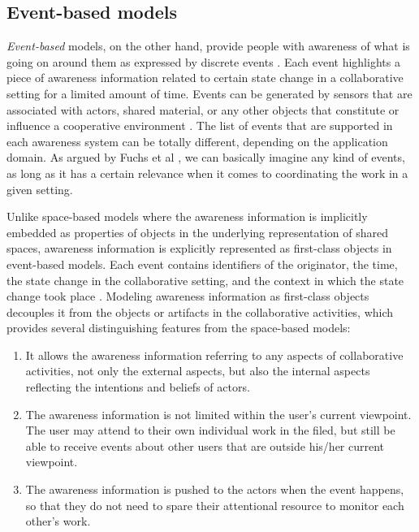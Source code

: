 \subsection{Event-based models} %
\label{sub:event_based_model}
\emph{Event-based} models, on the other hand, provide people with awareness of what is going on around them as expressed by discrete events \cite{rittenbruch2009a}. Each event highlights a piece of awareness information related to certain state change in a collaborative setting for a limited amount of time. Events can be generated by sensors that are associated with actors, shared material, or any other objects that constitute or influence a cooperative environment \cite{prinz1999a}. The list of events that are supported in each awareness system can be totally different, depending on the application domain. As argued by Fuchs et al \cite{Fuchs1995}, we can basically imagine any kind of events, as long as it has a certain relevance when it comes to coordinating the work in a given setting. 

Unlike space-based models where the awareness information is implicitly embedded as properties of objects in the underlying representation of shared spaces, awareness information is explicitly represented as first-class objects in event-based models. Each event contains identifiers of the originator, the time, the state change in the collaborative setting, and the context in which the state change took place \cite{fuchs1999a}. Modeling awareness information as first-class objects decouples it from the objects or artifacts in the collaborative activities, which provides several distinguishing features from the space-based models:

\begin{enumerate}
   \item It allows the awareness information referring to any aspects of collaborative activities, not only the external aspects, but also the internal aspects reflecting the intentions and beliefs of actors.
   \item The awareness information is not limited within the user's current viewpoint. The user may attend to their own individual work in the filed, but still be able to receive events about other users that are outside his/her current viewpoint. 
   \item The awareness information is pushed to the actors when the event happens, so that they do not need to spare their attentional resource to monitor each other's work.
\end{enumerate}


